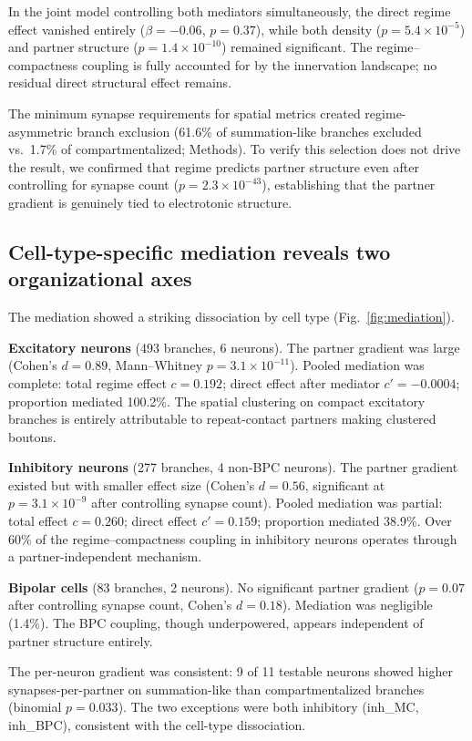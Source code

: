\documentclass[11pt]{article}
\begin{document}
In the joint model controlling both mediators simultaneously, the direct regime effect vanished entirely ($\beta = -0.06$, $p = 0.37$), while both density ($p = 5.4 \times 10^{-5}$) and partner structure ($p = 1.4 \times 10^{-10}$) remained significant. The regime--compactness coupling is fully accounted for by the innervation landscape; no residual direct structural effect remains.

The minimum synapse requirements for spatial metrics created regime-asymmetric branch exclusion (61.6\% of summation-like branches excluded vs.\ 1.7\% of compartmentalized; Methods). To verify this selection does not drive the result, we confirmed that regime predicts partner structure even after controlling for synapse count ($p = 2.3 \times 10^{-43}$), establishing that the partner gradient is genuinely tied to electrotonic structure.

\subsection{Cell-type-specific mediation reveals two organizational axes}

The mediation showed a striking dissociation by cell type (Fig.~\ref{fig:mediation}).

\textbf{Excitatory neurons} (493 branches, 6 neurons). The partner gradient was large (Cohen's $d = 0.89$, Mann--Whitney $p = 3.1 \times 10^{-11}$). Pooled mediation was complete: total regime effect $c = 0.192$; direct effect after mediator $c' = -0.0004$; proportion mediated 100.2\%. The spatial clustering on compact excitatory branches is entirely attributable to repeat-contact partners making clustered boutons.

\textbf{Inhibitory neurons} (277 branches, 4 non-BPC neurons). The partner gradient existed but with smaller effect size (Cohen's $d = 0.56$, significant at $p = 3.1 \times 10^{-9}$ after controlling synapse count). Pooled mediation was partial: total effect $c = 0.260$; direct effect $c' = 0.159$; proportion mediated 38.9\%. Over 60\% of the regime--compactness coupling in inhibitory neurons operates through a partner-independent mechanism.

\textbf{Bipolar cells} (83 branches, 2 neurons). No significant partner gradient ($p = 0.07$ after controlling synapse count, Cohen's $d = 0.18$). Mediation was negligible (1.4\%). The BPC coupling, though underpowered, appears independent of partner structure entirely.

The per-neuron gradient was consistent: 9 of 11 testable neurons showed higher synapses-per-partner on summation-like than compartmentalized branches (binomial $p = 0.033$). The two exceptions were both inhibitory (inh\_MC, inh\_BPC), consistent with the cell-type dissociation.
\end{document}
